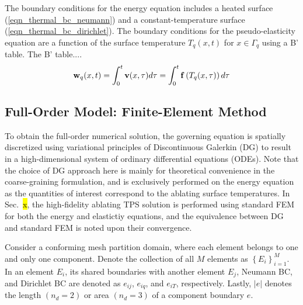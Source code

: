 The boundary conditions for the energy equation includes a heated surface (\cref{eqn_thermal_bc_neumann}) and a constant-temperature surface (\cref{eqn_thermal_bc_dirichlet}). The boundary conditions for the pseudo-elasticity equation are a function of the surface temperature $T_q(x,t)$ for $x\in\Gamma_q$ using a B' table. The B' table....
\begin{equation}
    \mathbf{w}_q(x,t) = \int_{0}^{t} \mathbf{v}(x,\tau)d\tau = \int_{0}^{t}\mathbf{f}\left(T_q(x,\tau)\right)d\tau\label{eqn_boundary_displacement}
\end{equation}

\subsection{Full-Order Model: Finite-Element Method}\label{sec_fom}

To obtain the full-order numerical solution, the governing equation is spatially discretized using variational principles of Discontinuous Galerkin (DG) to result in a high-dimensional system of ordinary differential equations (ODEs). Note that the choice of DG approach here is mainly for theoretical convenience in the coarse-graining formulation, and is exclusively performed on the energy equation as the quantities of interest correspond to the ablating surface temperatures. In Sec.~\hl{x}, the high-fidelity ablating TPS solution is performed using standard FEM for both the energy and elastictiy equations, and the equivalence between DG and standard FEM is noted upon their convergence.

Consider a conforming mesh partition domain, where each element belongs to one and only one component. Denote the collection of all $M$ elements as $\left\{E_i\right\}_{i=1}^{M}$. In an element $E_i$, its shared boundaries with another element $E_j$, Neumann BC, and Dirichlet BC are denoted as $e_{ij}$, $e_{iq}$, and $e_{iT}$, respectively. Lastly, $\left|e\right|$ denotes the length $(n_d=2)$ or area $(n_d=3)$ of a component boundary $e$.

